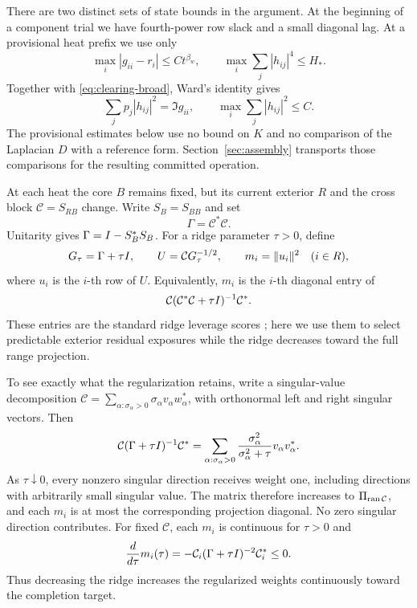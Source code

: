 There are two distinct sets of state bounds in the argument.  At the beginning
of a component trial we have fourth-power row slack and a small diagonal lag.
At a provisional heat prefix we use only
\begin{equation}\label{eq:clearing-prestate}
 \max_i|g_{ii}-r_i|\le C t^{\beta_w},\qquad
 \max_i\sum_j|h_{ij}|^4\le H_*.
\end{equation}
Together with \eqref{eq:clearing-broad}, Ward's identity gives
\begin{equation}\label{eq:clearing-row-bound}
 \sum_jp_j|h_{ij}|^2=\Im g_{ii},\qquad
 \max_i\sum_j|h_{ij}|^2\le C.
\end{equation}
The provisional estimates below use no bound on $K$ and no comparison of the
Laplacian $D$ with a reference form. Section~\ref{sec:assembly} transports
those comparisons for the resulting committed operation.

At each heat the core $B$ remains fixed, but its current exterior $R$ and
the cross block $\mathcal C=S_{RB}$ change. Write $S_B=S_{BB}$ and set
\[
 \Gamma=\mathcal C^*\mathcal C.
\]
Unitarity gives $\Gamma=I-S_B^*S_B$.
For a ridge parameter $\tau>0$, define
\begin{equation}\label{eq:clearing-ridge}
 G_\tau=\Gamma+\tau I,\qquad
 U=\mathcal C G_\tau^{-1/2},\qquad
 m_i=\|u_i\|^2\quad(i\in R),
\end{equation}
where $u_i$ is the $i$-th row of $U$. Equivalently, $m_i$ is the $i$-th
diagonal entry of
\[
 \mathcal C(\mathcal C^*\mathcal C+\tau I)^{-1}\mathcal C^*.
\]
These entries are the standard ridge leverage scores
\cite[Section~3.3, Definition~1]{ElAlaouiMahoney2015}; here we use them to
select predictable exterior residual exposures while the ridge decreases
toward the full range projection.

To see exactly what the regularization retains, write a singular-value
decomposition
$\mathcal C=\sum_{\alpha:\sigma_\alpha>0}\sigma_\alpha v_\alpha w_\alpha^*$,
with orthonormal left and right singular vectors. Then
\[
 \mathcal C(\Gamma+\tau I)^{-1}\mathcal C^*
 =\sum_{\alpha:\sigma_\alpha>0}
       \frac{\sigma_\alpha^2}{\sigma_\alpha^2+\tau}
       v_\alpha v_\alpha^*.
\]
As $\tau\downarrow0$, every nonzero singular direction receives weight
one, including directions with arbitrarily small singular value. The
matrix therefore increases to $\Pi_{\operatorname{ran}\mathcal C}$, and each $m_i$ is
at most the corresponding projection diagonal. No zero singular direction
contributes. For fixed $\mathcal C$, each $m_i$ is continuous for
$\tau>0$ and
\[
 \frac{d}{d\tau}m_i(\tau)
 =-\mathcal C_i(\Gamma+\tau I)^{-2}\mathcal C_i^*\le0.
\]
Thus decreasing the ridge increases the regularized weights continuously
toward the completion target.

